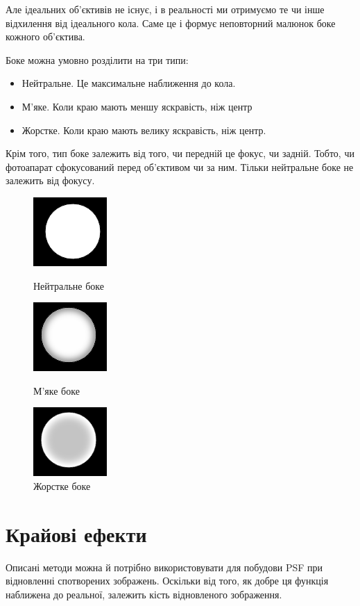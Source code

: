 \documentclass{diploma}
\begin{document}
    Але ідеальних об’єктивів не існує, і в реальності ми отримуємо те чи інше
    відхилення від ідеального кола.
    Саме це і формує неповторний малюнок боке кожного об’єктива.

    Боке можна умовно розділити на три типи:
    \begin{itemize}
      \item Нейтральне. Це максимальне наближення до кола.
      \item М’яке. Коли краю мають меншу яскравість, ніж центр
      \item Жорстке. Коли краю мають велику яскравість, ніж центр.
    \end{itemize}
    Крім того, тип боке залежить від того, чи передній це фокус, чи
    задній.
    Тобто, чи фотоапарат сфокусований перед об’єктивом чи за ним.
    Тільки нейтральне боке не залежить від фокусу.

    \begin{figure}[h]
        \centering
        \includegraphics{neutral_boke.png}
        \caption{Нейтральне боке}
        \label{fig:neutral_boke}
      \endminipage\hfill
        \centering
        \includegraphics{soft_boke.png}
        \caption{М’яке боке}
        \label{fig:soft_boke}
      \endminipage\hfill
        \centering
        \includegraphics{hard_boke.png}
        \caption{Жорстке боке}
        \label{fig:hard_boke}
      \endminipage\hfill
    \end{figure}
    \clearpage
  \section{Крайові ефекти}
    Описані методи можна й потрібно використовувати для побудови PSF при
    відновленні спотворених зображень.
    Оскільки від того, як добре ця функція наближена до реальної, залежить
    кість відновленого зображення.
\end{document}
